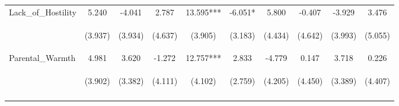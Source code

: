 \begin{tabular}{lccccccccc}
\noalign{\smallskip}Lack\_of\_Hostility & 5.240 & -4.041 & 2.787 & 13.595*** & -6.051* & 5.800 & -0.407 & -3.929 & 3.476\\
 & \begin{footnotesize}(3.937)\end{footnotesize} & \begin{footnotesize}(3.934)\end{footnotesize} & \begin{footnotesize}(4.637)\end{footnotesize} & \begin{footnotesize}(3.905)\end{footnotesize} & \begin{footnotesize}(3.183)\end{footnotesize} & \begin{footnotesize}(4.434)\end{footnotesize} & \begin{footnotesize}(4.642)\end{footnotesize} & \begin{footnotesize}(3.993)\end{footnotesize} & \begin{footnotesize}(5.055)\end{footnotesize}\\
\noalign{\smallskip}Parental\_Warmth & 4.981 & 3.620 & -1.272 & 12.757*** & 2.833 & -4.779 & 0.147 & 3.718 & 0.226\\
 & \begin{footnotesize}(3.902)\end{footnotesize} & \begin{footnotesize}(3.382)\end{footnotesize} & \begin{footnotesize}(4.111)\end{footnotesize} & \begin{footnotesize}(4.102)\end{footnotesize} & \begin{footnotesize}(2.759)\end{footnotesize} & \begin{footnotesize}(4.205)\end{footnotesize} & \begin{footnotesize}(4.450)\end{footnotesize} & \begin{footnotesize}(3.389)\end{footnotesize} & \begin{footnotesize}(4.407)\end{footnotesize}\\
\noalign{\smallskip}\hline\end{tabular}\\
